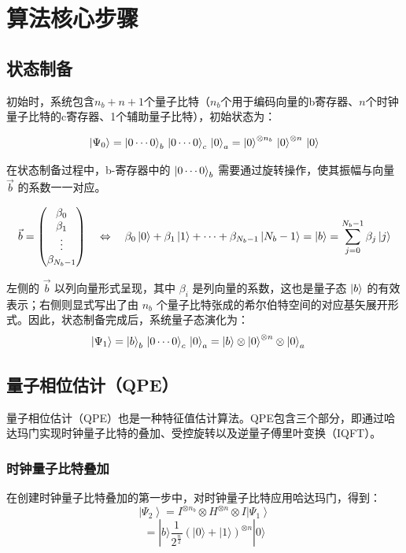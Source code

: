 \documentclass{article}
\begin{document}
\section{算法核心步骤}
\subsection{状态制备}
初始时，系统包含\( n_b + n + 1 \)个量子比特（\( n_b \)个用于编码向量的b寄存器、\( n \)个时钟量子比特的c寄存器、1个辅助量子比特），初始状态为：

\[\ket{\Psi_0} 
= \ket{0 \cdots 0}_b \, \ket{0 \cdots 0}_c \, \ket{0}_a 
= \ket{0}^{\otimes n_b} \, \ket{0}^{\otimes n} \, \ket{0}\]

在状态制备过程中，b-寄存器中的 \(\ket{0 \cdots 0}_b\) 需要通过旋转操作，使其振幅与向量 \(\vec{b}\) 的系数一一对应。

\[
\vec{b} 
= \begin{pmatrix} 
\beta_0 \\ 
\beta_1 \\ 
\vdots \\ 
\beta_{N_b - 1} 
\end{pmatrix} 
\quad\Leftrightarrow\quad 
\beta_0\ket{0} + \beta_1\ket{1} + \cdots + \beta_{N_b - 1}\ket{N_b - 1} 
= \ket{b}= \sum_{j=0}^{N_b-1} \beta_j \ket{j}
\]

左侧的 \(\vec{b}\) 以列向量形式呈现，其中 \(\beta_i\) 是列向量的系数，这也是量子态 \(\ket{b}\) 的有效表示；右侧则显式写出了由 \( n_b \) 个量子比特张成的希尔伯特空间的对应基矢展开形式。因此，状态制备完成后，系统量子态演化为：
\[
\ket{\Psi_1} 
= \ket{b}_b \, \ket{0 \cdots 0}_c \, \ket{0}_a = \ket{b} \otimes \ket{0}^{\otimes n} \otimes \ket{0}_a \quad \text{}
\]
\subsection{量子相位估计（QPE）}
量子相位估计（QPE）也是一种特征值估计算法。QPE包含三个部分，即通过哈达玛门实现时钟量子比特的叠加、受控旋转以及逆量子傅里叶变换（IQFT）。
\subsubsection{时钟量子比特叠加}
在创建时钟量子比特叠加的第一步中，对时钟量子比特应用哈达玛门，得到：
\[
\left|\Psi_{2}\right>=I^{\otimes n_{b}} \otimes H^{\otimes n} \otimes I\left|\Psi_{1}\right>
\]
\[
=|b\rangle \frac{1}{2^{\frac{n}{2}}}{\left(|0\rangle+|1\rangle\right)}^{\otimes n}|0\rangle
\]
\end{document}
